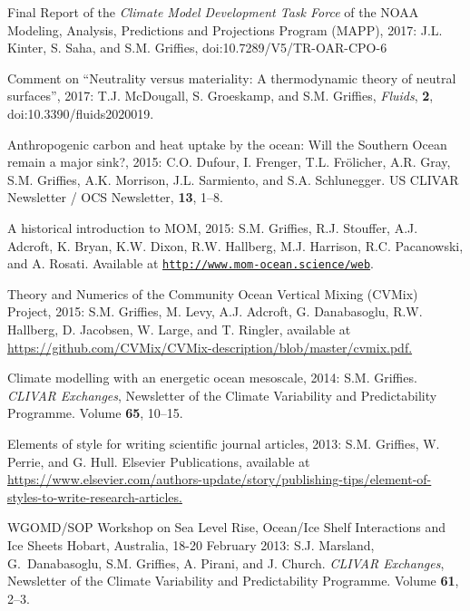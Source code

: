 \begin{etaremune}
\item Final Report of the {\it Climate Model Development Task Force} of the NOAA Modeling, Analysis, Predictions and Projections Program (MAPP), 2017: J.L. Kinter, S. Saha, and S.M. Grif\/fies, doi:10.7289/V5/TR-OAR-CPO-6

\item Comment on ``Neutrality versus materiality: A thermodynamic theory of neutral surfaces'', 2017: T.J. McDougall, S. Groeskamp, and S.M. Grif\/fies, {\it Fluids}, {\bf 2},  doi:10.3390/fluids2020019.

\item Anthropogenic carbon and heat uptake by the ocean: Will the Southern Ocean remain a major sink?, 2015: C.O. Dufour, I. Frenger, T.L. Fr\"{o}licher, A.R. Gray, S.M. Grif\/f\/ies, A.K. Morrison, J.L. Sarmiento, and S.A. Schlunegger.  US CLIVAR Newsletter / OCS Newsletter, {\bf 13}, 1--8.

\item A historical introduction to MOM, 2015: S.M. Grif\/f\/ies, R.J. Stouffer, A.J. Adcroft, K. Bryan, K.W. Dixon, R.W. Hallberg, M.J. Harrison, R.C. Pacanowski, and A. Rosati.  Available at \href{\tt  http://www.mom-ocean.science/web/docs/project/mom_history_v15.09.05.pdf}{\tt http://www.mom-ocean.science/web}.
  
  
\item Theory and Numerics of the Community Ocean Vertical Mixing (CVMix) Project, 2015: S.M. Grif\/f\/ies, M. Levy, A.J. Adcroft, G. Danabasoglu, R.W. Hallberg, D. Jacobsen, W. Large, and T. Ringler, available at \\ \href{https://github.com/CVMix/CVMix-description/blob/master/cvmix.pdf}{https://github.com/CVMix/CVMix-description/blob/master/cvmix.pdf.}

\item Climate modelling with an energetic ocean mesoscale, 2014: S.M. Grif\/f\/ies.  {\em CLIVAR Exchanges}, Newsletter of the Climate Variability and Predictability Programme.  Volume {\bf 65}, 10--15.

\item Elements of style for writing scientific journal articles, 2013: S.M. Grif\/f\/ies, W. Perrie, and G. Hull. Elsevier Publications, available at \href{https://www.elsevier.com/authors-update/story/publishing-tips/element-of-styles-to-write-research-articles}{https://www.elsevier.com/authors-update/story/publishing-tips/element-of-styles-to-write-research-articles.}

\item WGOMD/SOP Workshop on Sea Level Rise, Ocean/Ice Shelf Interactions and Ice Sheets Hobart, Australia, 18-20 February 2013: S.J. Marsland, G.\ Danabasoglu, S.M. Grif\/f\/ies, A. Pirani, and J. Church.  {\em CLIVAR Exchanges}, Newsletter of the Climate Variability and Predictability Programme.  Volume {\bf 61}, 2--3.


\end{etaremune}
